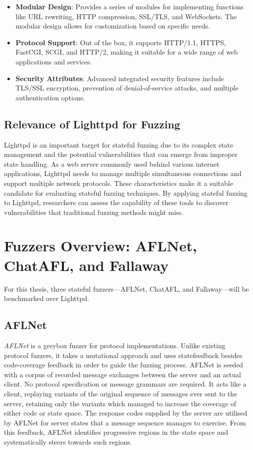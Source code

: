 \begin{itemize}
    \item \textbf{Modular Design}: Provides a series of modules for implementing functions like URL rewriting, HTTP compression, SSL/TLS, and WebSockets. The modular design allows for customization based on specific needs.
    
    \item \textbf{Protocol Support}: Out of the box, it supports HTTP/1.1, HTTPS, FastCGI, SCGI, and HTTP/2, making it suitable for a wide range of web applications and services.
    
    \item \textbf{Security Attributes}: Advanced integrated security features include TLS/SSL encryption, prevention of denial-of-service attacks, and multiple authentication options.
\end{itemize}

\subsection{Relevance of Lighttpd for Fuzzing}

Lighttpd is an important target for stateful fuzzing due to its complex state management and the potential vulnerabilities that can emerge from improper state handling. As a web server commonly used behind various internet applications, Lighttpd needs to manage multiple simultaneous connections and support multiple network protocols. These characteristics make it a suitable candidate for evaluating stateful fuzzing techniques. By applying stateful fuzzing to Lighttpd, researchers can assess the capability of these tools to discover vulnerabilities that traditional fuzzing methods might miss.

\section{Fuzzers Overview: AFLNet, ChatAFL, and Fallaway}

For this thesis, three stateful fuzzers—AFLNet, ChatAFL, and Fallaway—will be benchmarked over Lighttpd.

\subsection{AFLNet}
\textit{AFLNet} \cite{AFLNet} is a greybox fuzzer for protocol implementations. Unlike existing protocol fuzzers, it takes a mutational approach and uses statefeedback besides code-coverage feedback in order to guide the fuzzing process. AFLNet is seeded with a corpus of recorded message exchanges between the server and an actual client. No protocol specification or message grammars are required. It acts like a client, replaying variants of the original sequence of messages ever sent to the server, retaining only the variants which managed to increase the coverage of either code or state space. The response codes supplied by the server are utilised by AFLNet for server states that a message sequence manages to exercise. From this feedback, AFLNet identifies progressive regions in the state space and systematically steers towards such regions. 



